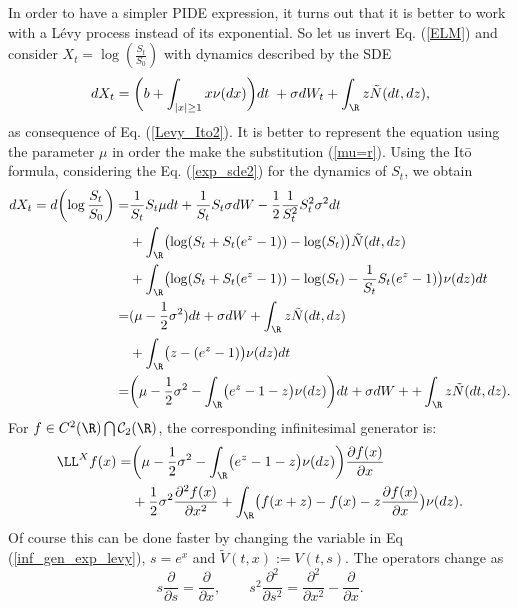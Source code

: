 In order to have a simpler PIDE expression, it turns out that it is better to work with a Lévy process instead of its exponential. So let us invert Eq. (\ref{ELM})
and consider $ X_t = \log \left( \frac{S_t}{S_0} \right)$ with dynamics described by the SDE 
\begin{equation}\label{SDE_log_var}
 dX_t = \biggl( b + \int_{|x|\geq 1}x \nu(dx) \biggr) dt \; + \sigma dW_t + \int_{\R} z \tilde N(dt,dz),
\end{equation}
as consequence of Eq. (\ref{Levy_Ito2}). It is better to represent the equation using the parameter $\mu$ in order the make the substitution (\ref{mu=r}). Using the It\=o formula,
considering the Eq. (\ref{exp_sde2}) for the dynamics of $S_t$, we obtain
\begin{align*}
 dX_t = d\biggl( \log \frac{S_t}{S_0}\biggr) =& \frac{1}{S_t} S_t \mu dt + \frac{1}{S_t} S_t \sigma dW - \frac{1}{2} \frac{1}{S_t^2} S_t^2 \sigma^2 dt \\
 &  + \int_{\R} \bigl( \log(S_t+S_t(e^z-1)) - \log(S_t) \bigr) \tilde N(dt,dz) \\
 &  + \int_{\R} \bigl( \log(S_t+S_t(e^z-1)) - \log(S_t) -\frac{1}{S_t} S_t (e^z-1) \bigr) \nu(dz)dt \\
 =& (\mu-\frac{1}{2}\sigma^2)dt + \sigma dW + \int_{\R} z \tilde N(dt,dz) \\
 &  + \int_{\R} \bigl( z - (e^z-1) \bigr) \nu(dz) dt \\
 =& \biggl( \mu-\frac{1}{2}\sigma^2 - \int_{\R} \bigl( e^z-1-z \bigr) \nu(dz) \biggr)dt + \sigma dW + + \int_{\R} z \tilde N(dt,dz).
\end{align*}
For $f \in C^{2}(\R) \bigcap \mathcal{C}_2(\R)$, the corresponding infinitesimal generator is:
\begin{align}\label{RN_log_gen}
 \LL^X f(x) =& \biggl( \mu-\frac{1}{2}\sigma^2 - \int_{\R} \bigl( e^z-1-z \bigr) \nu(dz) \biggr) \frac{\partial f(x)}{\partial x} \\ \nonumber
          &+ \frac{1}{2} \sigma^2 \frac{\partial^2 f(x)}{\partial x^2} 
          + \int_{\R} \bigl( f(x+z)- f(x) - z \frac{\partial f(x)}{\partial x} \bigr) \nu(dz).
\end{align}
Of course this can be done faster by changing the variable in Eq (\ref{inf_gen_exp_levy}), $s = e^x$ and $\tilde V(t,x) := V(t,s)$. The operators change as
\begin{equation}\label{log_var}
s \frac{\partial}{\partial s} = \frac{\partial}{\partial x}, \hspace{2em} 
s^2 \frac{\partial^2}{\partial s^2} = \frac{\partial^2}{\partial x^2} - \frac{\partial}{\partial x} . 
\end{equation}
